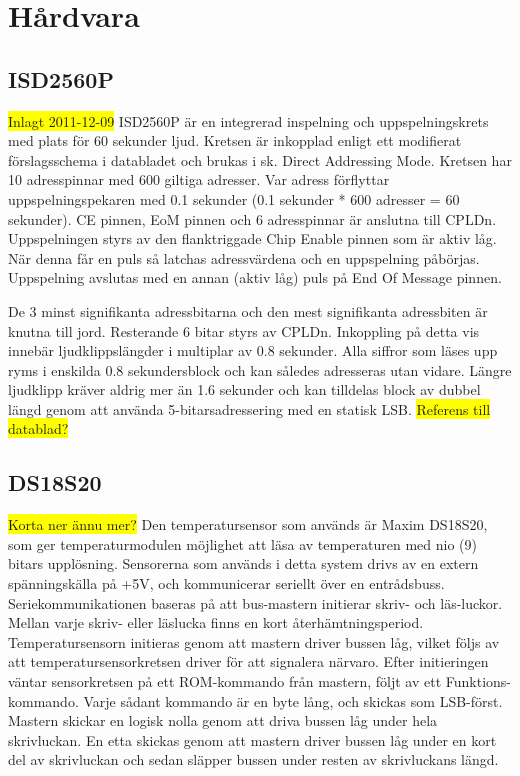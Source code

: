 \documentclass[a4paper,11pt]{article}
\begin{document}
\section{Hårdvara}
\label{hårdvara}
	\subsection{ISD2560P}
	\colorbox{yellow}{Inlagt 2011-12-09}
ISD2560P är en integrerad inspelning och uppspelningskrets med plats för 60 sekunder ljud. Kretsen är inkopplad enligt ett modifierat förslagsschema i databladet och brukas i sk. Direct Addressing Mode. Kretsen har 10 adresspinnar med 600 giltiga adresser. Var adress förflyttar uppspelningspekaren med 0.1 sekunder (0.1 sekunder * 600 adresser = 60 sekunder). CE pinnen, EoM pinnen och 6 adresspinnar är anslutna till CPLDn. Uppspelningen styrs av den flanktriggade Chip Enable pinnen som är aktiv låg. När denna får en puls så latchas adressvärdena och en uppspelning påbörjas. Uppspelning avslutas med en annan (aktiv låg) puls på End Of Message pinnen.

De 3 minst signifikanta adressbitarna och den mest signifikanta adressbiten är knutna till jord. Resterande 6 bitar styrs av CPLDn. Inkoppling på detta vis innebär ljudklippslängder i multiplar av 0.8 sekunder. Alla siffror som läses upp ryms i enskilda 0.8 sekundersblock och kan således adresseras utan vidare. Längre ljudklipp kräver aldrig mer än 1.6 sekunder och kan tilldelas block av dubbel längd genom att använda 5-bitarsadressering med en statisk LSB.
	\colorbox{yellow}{Referens till datablad?}

	\subsection{DS18S20}
	\label{DS18S20}
		\colorbox{yellow}{Korta ner ännu mer?}
		Den temperatursensor som används är Maxim DS18S20, som ger temperaturmodulen möjlighet att läsa av temperaturen
		med nio (9) bitars upplösning. Sensorerna som används i detta system drivs av en extern spänningskälla på +5V,
		och kommunicerar seriellt över en entrådsbuss. Seriekommunikationen baseras på att bus-mastern initierar skriv-
		och läs-luckor. Mellan varje skriv- eller läslucka finns en kort återhämtningsperiod. Temperatursensorn initieras genom att mastern
		driver bussen låg, vilket följs av att temperatursensorkretsen driver för att signalera närvaro.
		Efter initieringen väntar sensorkretsen på ett ROM-kommando från mastern,
		följt av ett Funktions-kommando. Varje sådant kommando är en byte lång, och skickas som LSB-först. Mastern skickar
		en logisk nolla genom att driva bussen låg under hela skrivluckan. En etta skickas genom att mastern driver bussen låg
		under en kort del av skrivluckan och sedan släpper bussen under resten av skrivluckans längd. 
\end{document}
